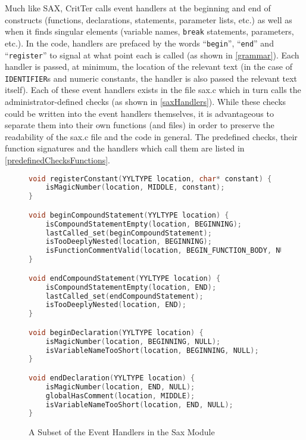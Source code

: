 \documentclass[12pt]{report}
\newcommand{\programName}{CritTer\xspace}
\begin{document}
Much like SAX, \programName calls event handlers at the beginning and end of constructs (functions, 
declarations, statements, parameter lists, etc.) as well as when it finds singular elements (variable 
names, \lstinline{break} statements, parameters, etc.). In the code, handlers are prefaced by the words 
``\lstinline{begin}'', ``\lstinline{end}'' and ``\lstinline{register}'' to signal at what point each is called (as 
shown in \autoref{grammar}). Each handler is passed, at minimum, the location of the relevant text (in 
the case of \lstinline{IDENTIFIER}s and numeric constants, the handler is also passed the relevant 
text itself). Each of these event handlers exists in the file sax.c which in turn calls the 
administrator-defined checks (as shown in \autoref{saxHandlers}). While these checks could be written 
into the event handlers themselves, it is advantageous to separate them into their own functions (and 
files) in order to preserve the readability of the sax.c file and the code in general. The predefined checks, 
their function signatures and the handlers which call them are listed in 
\autoref{predefinedChecksFunctions}.

\begin{figure}
\begin{lstlisting}[language=C]
void registerConstant(YYLTYPE location, char* constant) {
	isMagicNumber(location, MIDDLE, constant);
}

void beginCompoundStatement(YYLTYPE location) {
	isCompoundStatementEmpty(location, BEGINNING);
	lastCalled_set(beginCompoundStatement);
	isTooDeeplyNested(location, BEGINNING);
	isFunctionCommentValid(location, BEGIN_FUNCTION_BODY, NULL);
}

void endCompoundStatement(YYLTYPE location) {
	isCompoundStatementEmpty(location, END);
	lastCalled_set(endCompoundStatement);
	isTooDeeplyNested(location, END);
}

void beginDeclaration(YYLTYPE location) {
	isMagicNumber(location, BEGINNING, NULL);
	isVariableNameTooShort(location, BEGINNING, NULL);
}

void endDeclaration(YYLTYPE location) {
	isMagicNumber(location, END, NULL);
	globalHasComment(location, MIDDLE);
	isVariableNameTooShort(location, END, NULL);
}
\end{lstlisting}
\caption{A Subset of the Event Handlers in the Sax Module}
\label{saxHandlers}
\end{figure}
\end{document}
